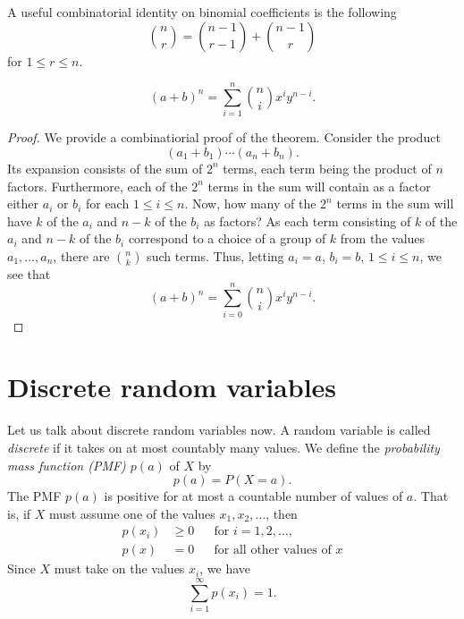 A useful combinatorial identity on binomial coefficients is the following
\[
  \binom{n}{r}=\binom{n-1}{r-1}+\binom{n-1}{r}
\]
for \(1\leq r\leq n\).

\begin{theorem}
  \[
    (a+b)^n=\sum_{i=1}^n\binom{n}{i}x^iy^{n-i}.
  \]
\end{theorem}
\begin{proof}
  We provide a combinatiorial proof of the theorem. Consider the product
  \[
    (a_1+b_1)\dotsm(a_n+b_n).
  \]
  Its expansion consists of the sum of \(2^n\) terms, each term being the
  product of \(n\) factors. Furthermore, each of the \(2^n\) terms in the
  sum will contain as a factor either \(a_i\) or \(b_i\) for each
  \(1\leq i\leq n\). Now, how many of the \(2^n\) terms in the sum will
  have \(k\) of the \(a_i\) and \(n-k\) of the \(b_i\) as factors? As each
  term consisting of \(k\) of the \(a_i\) and \(n-k\) of the \(b_i\)
  correspond to a choice of a group of \(k\) from the values
  \(a_1,\dotsc,a_n\), there are \(\binom{n}{k}\) such terms. Thus, letting
  \(a_i=a\), \(b_i=b\), \(1\leq i\leq n\), we see that
  \[
    (a+b)^n=\sum_{i=0}^n\binom{n}{i}x^iy^{n-i}.
  \]
\end{proof}

\section{Discrete random variables}
Let us talk about discrete random variables now. A random variable is
called \emph{discrete} if it takes on at most countably many values. We
define the \emph{probability mass function (PMF) \(p(a)\)}  of \(X\) by
\[
  p(a)=P(X=a).
\]
The PMF \(p(a)\) is positive for at most a countable number of values of
\(a\). That is, if \(X\) must assume one of the values \(x_1,x_2,\dotsc\),
then
\[
  \begin{aligned}
    p(x_i)&\geq 0&&\text{for \(i=1,2,\dotsc\),}\\
    p(x)&=0&&\text{for all other values of \(x\)}
  \end{aligned}
\]
Since \(X\) must take on the values \(x_i\), we have
\[
  \sum_{i=1}^\infty p(x_i)=1.
\]


